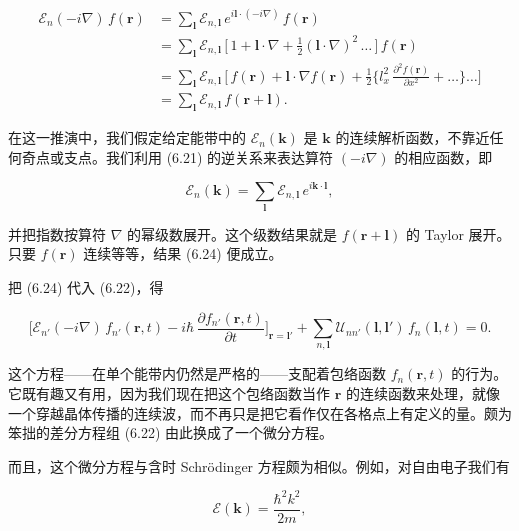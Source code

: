 \begin{align*}
\mathcal{E}_n(-i\nabla)\,f(\mathbf{r}) &= \sum_{\boldsymbol{l}} \mathcal{E}_{n,\boldsymbol{l}}\,e^{i\boldsymbol{l}\cdot(-i\nabla)}\,f(\mathbf{r}) \\
&= \sum_{\boldsymbol{l}} \mathcal{E}_{n,\boldsymbol{l}}\,\big[\,1 + \boldsymbol{l}\cdot\nabla + \tfrac{1}{2}(\boldsymbol{l}\cdot\nabla)^2\,\ldots\,\big]\,f(\mathbf{r}) \\
&= \sum_{\boldsymbol{l}} \mathcal{E}_{n,\boldsymbol{l}}\,\Big[\,f(\mathbf{r}) + \boldsymbol{l}\cdot\nabla f(\mathbf{r}) + \frac{1}{2}\Big\{l_x^2\,\frac{\partial^2 f(\mathbf{r})}{\partial x^2} + \ldots\Big\}\ldots\Big] \\
&= \sum_{\boldsymbol{l}} \mathcal{E}_{n,\boldsymbol{l}}\,f(\mathbf{r}+\boldsymbol{l}). \tag{6.24}
\end{align*}

在这一推演中，我们假定给定能带中的 $\mathcal{E}_n(\mathbf{k})$ 是 $\mathbf{k}$ 的连续解析函数，不靠近任何奇点或支点。我们利用 (6.21) 的逆关系来表达算符 $(-i\nabla)$ 的相应函数，即

\begin{equation*}
\mathcal{E}_n(\mathbf{k}) = \sum_{\boldsymbol{l}} \mathcal{E}_{n,\boldsymbol{l}}\,e^{i\mathbf{k}\cdot\boldsymbol{l}},
\tag{6.25}
\end{equation*}

并把指数按算符 $\nabla$ 的幂级数展开。这个级数结果就是 $f(\mathbf{r}+\boldsymbol{l})$ 的 Taylor 展开。只要 $f(\mathbf{r})$ 连续等等，结果 (6.24) 便成立。

把 (6.24) 代入 (6.22)，得

\begin{equation*}
\Big[\mathcal{E}_{n'}(-i\nabla)\,f_{n'}(\mathbf{r},t) - i\hbar\,\frac{\partial f_{n'}(\mathbf{r},t)}{\partial t}\Big]_{\mathbf{r}=\boldsymbol{l}'} + \sum_{n,\boldsymbol{l}} \mathcal{U}_{nn'}(\boldsymbol{l},\boldsymbol{l}')\,f_n(\boldsymbol{l},t) = 0.
\tag{6.26}
\end{equation*}

这个方程——在单个能带内仍然是严格的——支配着包络函数 $f_n(\mathbf{r},t)$ 的行为。它既有趣又有用，因为我们现在把这个包络函数当作 $\mathbf{r}$ 的连续函数来处理，就像一个穿越晶体传播的连续波，而不再只是把它看作仅在各格点上有定义的量。颇为笨拙的差分方程组 (6.22) 由此换成了一个微分方程。

而且，这个微分方程与含时 Schrödinger 方程颇为相似。例如，对自由电子我们有

\begin{equation*}
\mathcal{E}(\mathbf{k}) = \frac{\hbar^2 k^2}{2m},
\tag{6.27}
\end{equation*}

